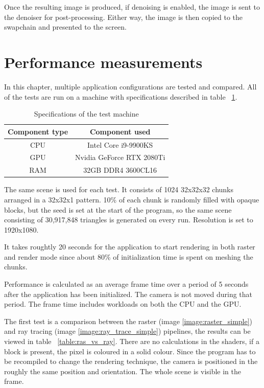 \documentclass[times, utf8, zavrsni, numeric]{fer}
\begin{document}
Once the resulting image is produced, if denoising is enabled, the image is sent to the denoiser for post-processing. Either way, the image is then copied to the swapchain and presented to the screen.

\section{Performance measurements}
In this chapter, multiple application configurations are tested and compared. All of the tests are run on a machine with specifications described in table ~\ref{table:specifications}.

\begin{table}[H]
\begin{center}
\caption{Specifications of the test machine}
\begin{tabular}{|c|c|}
\hline
Component type & Component used \\
\hline
CPU & Intel Core i9-9900KS \\
\hline
GPU & Nvidia GeForce RTX 2080Ti \\
\hline
RAM & 32GB DDR4 3600CL16 \\
\hline
\end{tabular}
\label{table:specifications}
\end{center}
\end{table}

The same scene is used for each test. It consists of 1024 32x32x32 chunks arranged in a 32x32x1 pattern. 10\% of each chunk is randomly filled with opaque blocks, but the seed is set at the start of the program, so the same scene consisting of 30,917,848 triangles is generated on every run. Resolution is set to 1920x1080.

It takes roughtly 20 seconds for the application to start rendering in both raster and render mode since about 80\% of initialization time is spent on meshing the chunks.

Performance is calculated as an average frame time over a period of 5 seconds after the application has been initialized. The camera is not moved during that period. The frame time includes workloads on both the CPU and the GPU.

The first test is a comparison between the raster (image \ref{image:raster_simple}) and ray tracing (image \ref{image:ray_trace_simple}) pipelines, the results can be viewed in table ~\ref{table:ras_vs_ray}. There are no calculations in the shaders, if a block is present, the pixel is coloured in a solid colour. Since the program has to be recompiled to change the rendering technique, the camera is positioned in the roughly the same position and orientation. The whole scene is visible in the frame.
\end{document}
